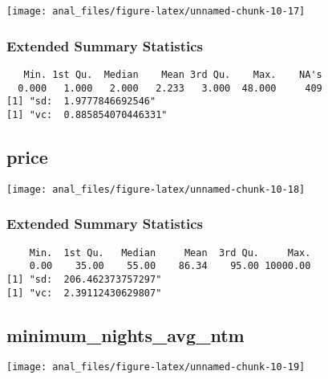 \begin{center}\texttt{[image: anal\_files/figure-latex/unnamed-chunk-10-17]} \end{center}

\hypertarget{extended-summary-statistics-3}{%
\subsubsection{Extended Summary
Statistics}\label{extended-summary-statistics-3}}

\begin{verbatim}   Min. 1st Qu.  Median    Mean 3rd Qu.    Max.    NA's 
  0.000   1.000   2.000   2.233   3.000  48.000     409 
[1] "sd:  1.9777846692546"
[1] "vc:  0.885854070446331"
\end{verbatim}

\pagebreak

\hypertarget{price}{%
\subsection{price}\label{price}}

\begin{center}\texttt{[image: anal\_files/figure-latex/unnamed-chunk-10-18]} \end{center}

\hypertarget{extended-summary-statistics-4}{%
\subsubsection{Extended Summary
Statistics}\label{extended-summary-statistics-4}}

\begin{verbatim}    Min.  1st Qu.   Median     Mean  3rd Qu.     Max. 
    0.00    35.00    55.00    86.34    95.00 10000.00 
[1] "sd:  206.462373757297"
[1] "vc:  2.39112430629807"
\end{verbatim}

\pagebreak

\hypertarget{minimum_nights_avg_ntm}{%
\subsection{minimum\_nights\_avg\_ntm}\label{minimum_nights_avg_ntm}}

\begin{center}\texttt{[image: anal\_files/figure-latex/unnamed-chunk-10-19]} \end{center}

